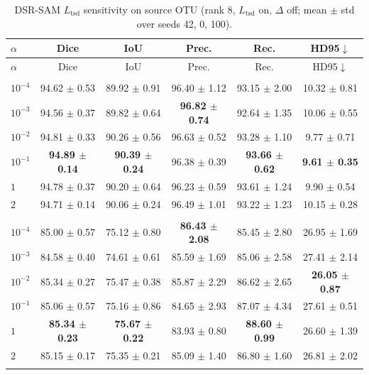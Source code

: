 \documentclass[10pt]{article}
\begin{document}
{\small
\begin{longtable}{lccccc}
\caption{DSR-SAM $L_{\mathrm{tsd}}$ sensitivity on source OTU (rank 8, $L_{\mathrm{tsd}}$ on, $\Delta$ off; mean $\pm$ std over seeds 42, 0, 100).}
\label{tab:ltsd_alpha_otu}\\
\toprule
$\alpha$ & Dice & IoU & Prec. & Rec. & HD95$\downarrow$ \\
\midrule
\endfirsthead
\toprule
$\alpha$ & Dice & IoU & Prec. & Rec. & HD95$\downarrow$ \\
\midrule
\endhead
\endfoot
\bottomrule
\endlastfoot
\multicolumn{6}{l}{\textit{Target: OVATUS}} \\
\midrule
$10^{-4}$ & 94.62 $\pm$ 0.53 & 89.92 $\pm$ 0.91 & 96.40 $\pm$ 1.12 & 93.15 $\pm$ 2.00 & 10.32 $\pm$ 0.81 \\
$10^{-3}$ & 94.56 $\pm$ 0.37 & 89.82 $\pm$ 0.64 & \textbf{96.82 $\pm$ 0.74} & 92.64 $\pm$ 1.35 & 10.06 $\pm$ 0.55 \\
$10^{-2}$ & 94.81 $\pm$ 0.33 & 90.26 $\pm$ 0.56 & 96.63 $\pm$ 0.52 & 93.28 $\pm$ 1.10 & 9.77 $\pm$ 0.71 \\
$10^{-1}$ & \textbf{94.89 $\pm$ 0.14} & \textbf{90.39 $\pm$ 0.24} & 96.38 $\pm$ 0.39 & \textbf{93.66 $\pm$ 0.62} & \textbf{9.61 $\pm$ 0.35} \\
$1$ & 94.78 $\pm$ 0.37 & 90.20 $\pm$ 0.64 & 96.23 $\pm$ 0.59 & 93.61 $\pm$ 1.24 & 9.90 $\pm$ 0.54 \\
$2$ & 94.71 $\pm$ 0.14 & 90.06 $\pm$ 0.24 & 96.49 $\pm$ 1.01 & 93.22 $\pm$ 1.23 & 10.15 $\pm$ 0.28 \\
\addlinespace[4pt]
\multicolumn{6}{l}{\textit{Target: USOVA}} \\
\midrule
$10^{-4}$ & 85.00 $\pm$ 0.57 & 75.12 $\pm$ 0.80 & \textbf{86.43 $\pm$ 2.08} & 85.45 $\pm$ 2.80 & 26.95 $\pm$ 1.69 \\
$10^{-3}$ & 84.58 $\pm$ 0.40 & 74.61 $\pm$ 0.61 & 85.59 $\pm$ 1.69 & 85.06 $\pm$ 2.58 & 27.41 $\pm$ 2.14 \\
$10^{-2}$ & 85.34 $\pm$ 0.27 & 75.47 $\pm$ 0.38 & 85.87 $\pm$ 2.29 & 86.62 $\pm$ 2.65 & \textbf{26.05 $\pm$ 0.87} \\
$10^{-1}$ & 85.06 $\pm$ 0.57 & 75.16 $\pm$ 0.86 & 84.65 $\pm$ 2.93 & 87.07 $\pm$ 4.34 & 27.61 $\pm$ 0.51 \\
$1$ & \textbf{85.34 $\pm$ 0.23} & \textbf{75.67 $\pm$ 0.22} & 83.93 $\pm$ 0.80 & \textbf{88.60 $\pm$ 0.99} & 26.60 $\pm$ 1.39 \\
$2$ & 85.15 $\pm$ 0.17 & 75.35 $\pm$ 0.21 & 85.09 $\pm$ 1.40 & 86.80 $\pm$ 1.60 & 26.81 $\pm$ 2.02 \\
\addlinespace[4pt]
\end{longtable}
}
\end{document}
